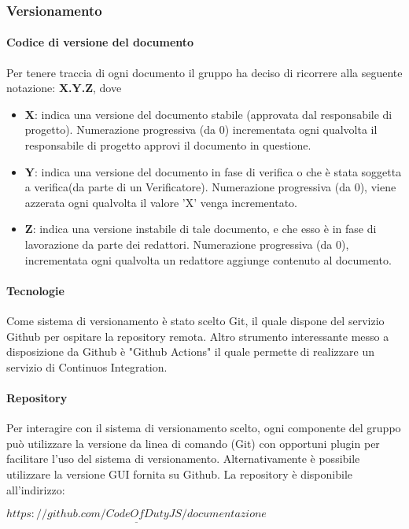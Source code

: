 		\subsubsection{Versionamento}
			
			\paragraph{Codice di versione del documento}
			Per tenere traccia di ogni documento il gruppo ha deciso di ricorrere alla seguente notazione: \textbf{X.Y.Z}, dove
			\begin{itemize}
				
				\item \textbf{X}: indica una versione del documento stabile (approvata dal responsabile di progetto). Numerazione progressiva (da 0) incrementata ogni qualvolta il responsabile di progetto approvi il documento in questione.
				
				\item \textbf{Y}: indica una versione del documento in fase di verifica o che è stata soggetta a verifica(da parte di un Verificatore). Numerazione progressiva (da 0), viene azzerata ogni qualvolta il valore 'X' venga incrementato.
				
				\item \textbf{Z}: indica una versione instabile di tale documento, e che esso è in fase di lavorazione da parte dei redattori. Numerazione progressiva (da 0), incrementata ogni qualvolta un redattore aggiunge contenuto al documento.
			\end{itemize}
			
			\paragraph{Tecnologie}
			Come sistema di versionamento è stato scelto Git, il quale dispone del servizio Github per ospitare la repository remota. Altro strumento interessante messo a disposizione da Github è "Github Actions" il quale permette di realizzare un servizio di Continuos Integration.
			
			\paragraph{Repository}
			Per interagire con il sistema di versionamento scelto, ogni componente del gruppo può utilizzare la versione da linea di comando (Git) con opportuni plugin per facilitare l'uso del sistema di versionamento. Alternativamente è possibile utilizzare la versione GUI fornita su Github. La repository è disponibile all'indirizzo:\\
			\begin{center}
				$\underline{https://github.com/CodeOfDutyJS/documentazione}$
			\end{center}
			
